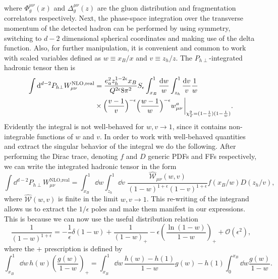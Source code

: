 where $\Phi^{\mu\nu}_g(x)$ and $\Delta_g^{\mu\nu}(z)$ are the gluon distribution and fragmentation correlators respectively. 
Next, the phase-space integration over the transverse momentum of the detected hadron can be performed by using symmetry, switching to $d-2$ dimensional spherical coordinates and making use of the delta function. Also, for further manipulation, it is convenient and common to work with scaled variables defined as $w\equiv x_B/x$ and $ v\equiv z_h/z$. The $P_{h\perp}$-integrated hadronic tensor then is
\begin{equation}
    \begin{aligned}
         \int \dd^{d-2}P_{h\perp} W_{\mu\nu}^{\text{NLO,real}}&=\frac{e_a^2z_h^{1-2\epsilon} x_B}{Q^{2\epsilon}8\pi^2}S_\epsilon    \int_{x_B}^{1} \frac{\dd w}{w}\int_{z_h}^{1}  \frac{\dd v}{v}\frac{1}{w}\\
         &\times\Big(\frac{v-1}{v} \Big)^{-\epsilon}\Big(\frac{w-1}{w}\Big)^{-\epsilon}w_{\mu\nu}^a\eval_{\chi_T^2=(1-\frac{1}{v})(1-\frac{1}{w})}  .
    \end{aligned}
\end{equation}
Evidently the integral is not well-behaved for $w,v\to 1$, since it contains non-integrable functions of $w$ and $v$. In order to work with well-behaved quantities and extract the singular behavior of the integral we do the following. After performing the Dirac trace, denoting $f$ and $D$ generic PDFs and FFs respectively, we can write the integrated hadronic tensor in the form
\begin{equation}
    \int \dd^{d-2}P_{h\perp} W_{\mu\nu}^{\text{NLO,real}}= \int_{x_B}^{1} \dd w\int_{z_h}^{1} \dd v \,\,\frac{\hat{\mathcal{W}}_{\mu\nu}(w,v)}{(1-w)^{1+\epsilon}(1-v)^{1+\epsilon}}f(x_B/w)D(z_h/v),
\end{equation}
where $\hat{\mathcal{W}}(w,v)$ is finite in the limit $w,v\to 1$. This re-writing of the integrand allows us to extract the $1/\epsilon$ poles and make them manifest in our expressions. This is because we can now use the useful distribution relation \cite{Schwartz:2014sze}
\begin{equation}
    \frac{1}{(1-w)^{1+\epsilon}}=-\frac{1}{\epsilon}\delta(1-w) + \frac{1}{(1-w)_+}-\epsilon\left(\frac{\ln(1-w)}{1-w}\right)_+ + \mathcal{O}(\epsilon^2),
\end{equation}
where the + prescription is defined by \cite{handbookqcdsterman95}
\begin{equation}
    \int_{x_B}^1 \dd w \,h(w)\left(\frac{g(w)}{1-w}\right)_+=\int _{x_B}^1\dd w \,\frac{h(w)-h(1)}{1-w}g(w) - h(1)\int_0^{x_B}\dd w \frac{g(w)}{1-w}.
\end{equation}
